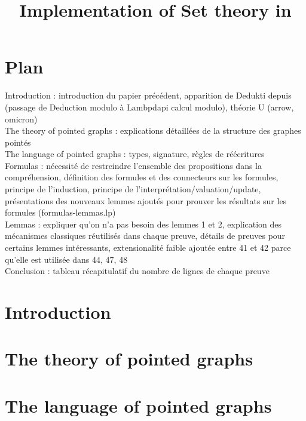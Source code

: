 \documentclass[a4paper]{article}
\title{Implementation of Set theory in \dedukti}
\date{}
\begin{document}
\thispagestyle{empty}
\maketitle


\section*{Plan}

Introduction : introduction du papier précédent, apparition de Dedukti depuis (passage de Deduction modulo à Lambpdapi calcul modulo), théorie U (arrow, omicron) \\

The theory of pointed graphs :  explications détaillées de la structure des graphes pointés \\

The language of pointed graphs : types, signature, règles de réécritures \\

Formulas : nécessité de restreindre l'ensemble des propositions dans la compréhension, définition des formules et des connecteurs sur les formules, principe de l'induction, principe de l'interprétation/valuation/update, présentations des nouveaux lemmes ajoutés pour prouver les résultats sur les formules (formulas-lemmas.lp) \\

Lemmas : expliquer qu'on n'a pas besoin des lemmes 1 et 2, explication des mécanismes classiques réutilisés dans chaque preuve, détails de preuves pour certains lemmes intéressants, extensionalité faible ajoutée entre 41 et 42 parce qu'elle est utilisée dans 44, 47, 48 \\

Conclusion : tableau récapitulatif du nombre de lignes de chaque preuve

\section{Introduction}


\section{The theory of pointed graphs}

\section{The language of pointed graphs}
\end{document}
